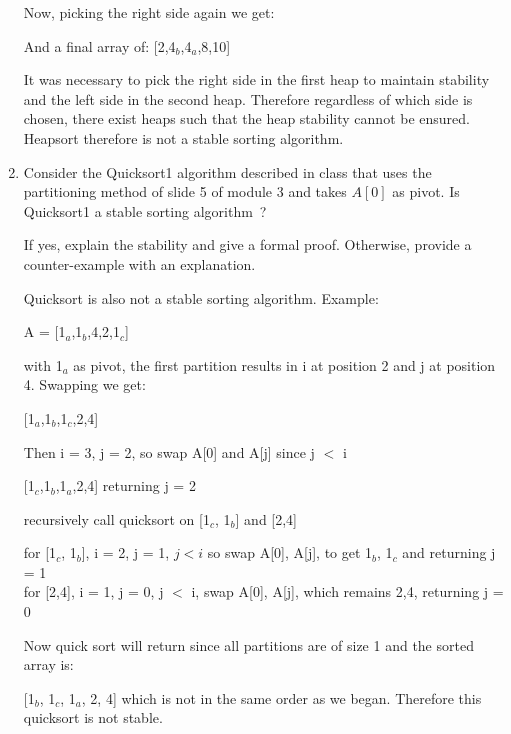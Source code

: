 \documentclass[12pt]{article}
\begin{document}
\begin{enumerate}
\begin{center}
\begin{tikzpicture}
\end{tikzpicture}\end{center}

Now, picking the right side again we get:

\begin{center}\end{center}

And a final array of: [2,4$_b$,4$_a$,8,10]

It was necessary to pick the right side in the first heap to maintain stability and the left
side in the second heap. Therefore regardless of which side is chosen, there exist heaps such that
the heap stability cannot be ensured. Heapsort therefore is not a stable sorting algorithm.


  \item Consider the Quicksort1 algorithm described in class that uses the
  partitioning method of slide 5 of module 3 and takes $A [0]$ as pivot. Is
  Quicksort1 a stable sorting algorithm~?
  
  If yes, explain the stability and give a formal proof. Otherwise, provide a
  counter-example with an explanation.

  Quicksort is also not a stable sorting algorithm. Example:

  A = [1$_a$,1$_b$,4,2,1$_c$]

  with 1$_a$ as pivot, the first partition results in i at position 2 and j at position 4. Swapping we get:

  [1$_a$,1$_b$,1$_c$,2,4]

  Then i = 3, j = 2, so swap A[0] and A[j] since j $<$ i

  [1$_c$,1$_b$,1$_a$,2,4] returning j = 2

  recursively call quicksort on [1$_c$, 1$_b$] and [2,4]

  for [1$_c$, 1$_b$], i = 2, j = 1, $j < i$ so swap A[0], A[j], to get 1$_b$, 1$_c$ and returning j = 1
  \\for [2,4], i = 1, j = 0, j $<$ i, swap A[0], A[j], which remains 2,4, returning j = 0

  Now quick sort will return since all partitions are of size 1 and the sorted array is:

  [1$_b$, 1$_c$, 1$_a$, 2, 4] which is not in the same order as we began. Therefore this quicksort is not stable.

\end{enumerate}
\end{document}
